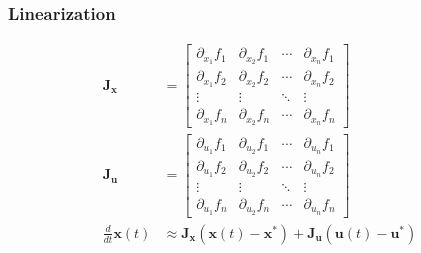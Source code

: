 \documentclass[aspectratio=169]{beamer}
\newcommand{\diff}[1]{\frac{d}{d #1}}
\begin{document}
\begin{frame}
    \frametitle{Linearization}

    \begin{align}
        \bm{J}_{\bm{x}} &=
        \begin{bmatrix}
            \partial_{x_1} f_1 & \partial_{x_2} f_1 & \cdots & \partial_{x_n} f_1 \\
            \partial_{x_1} f_2 & \partial_{x_2} f_2 & \cdots & \partial_{x_n} f_2 \\
            \vdots & \vdots & \ddots & \vdots \\
            \partial_{x_1} f_n & \partial_{x_2} f_n & \cdots & \partial_{x_n} f_n
        \end{bmatrix} \\
        \bm{J}_{\bm{u}} &=
        \begin{bmatrix}
            \partial_{u_1} f_1 & \partial_{u_2} f_1 & \cdots & \partial_{u_n} f_1 \\
            \partial_{u_1} f_2 & \partial_{u_2} f_2 & \cdots & \partial_{u_n} f_2 \\
            \vdots & \vdots & \ddots & \vdots \\
            \partial_{u_1} f_n & \partial_{u_2} f_n & \cdots & \partial_{u_n} f_n
        \end{bmatrix} \\
        \diff{t} \bm{x}(t) &\approx \bm{J}_{\bm{x}} (\bm{x}(t) - \bm{x}^\ast) + \bm{J}_{\bm{u}} (\bm{u}(t) -\bm{u}^\ast)
    \end{align}
\end{frame}
\end{document}
